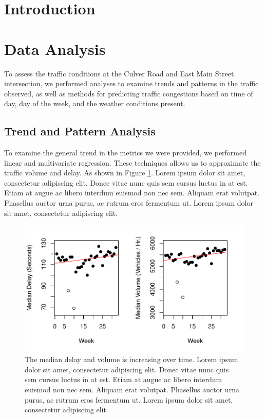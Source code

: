 \documentclass{report}
\begin{document}



\noindent
\section*{Introduction}




\noindent
\section*{Data Analysis}

To assess the traffic conditions at the Culver Road and East Main Street
intersection, we performed analyses to examine trends and patterns in the traffic
observed, as well as methods for predicting traffic congestions based on time of
day, day of the week, and the weather conditions present.


\subsection*{Trend and Pattern Analysis}

To examine the general trend in the metrics we were provided, we performed linear
and multivariate regression. These techniques allows us to approximate the traffic
volume and delay. As shown in Figure \ref{trends}. Lorem ipsum dolor sit amet,
consectetur adipiscing elit. Donec vitae nunc quis sem cursus luctus in at est.
Etiam at augue ac libero interdum euismod non nec sem. Aliquam erat volutpat.
Phasellus auctor urna purus, ac rutrum eros fermentum ut. Lorem ipsum dolor sit
amet, consectetur adipiscing elit.

\begin{figure}[h]
\centering
\includegraphics{upstat_report-002}
\caption{The median delay and volume is increasing over time. Lorem ipsum dolor
sit amet, consectetur adipiscing elit. Donec vitae nunc quis sem cursus luctus
in at est. Etiam at augue ac libero interdum euismod non nec sem. Aliquam erat
volutpat. Phasellus auctor urna purus, ac rutrum eros fermentum ut. Lorem ipsum
dolor sit amet, consectetur adipiscing elit.}
\label{trends}
\end{figure}
\end{document}
